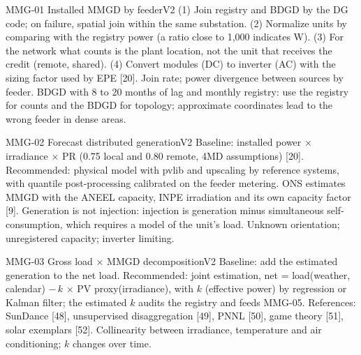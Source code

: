 \begin{ficha}{MMG-01 \textperiodcentered{} Installed MMGD by feeder}{V2}
 (1) Join registry and BDGD by the DG code; on failure,
spatial join within the same substation. (2) Normalize units by
comparing with the registry power (a ratio close to 1,000 indicates W). (3)
For the network what counts is the plant location, not the unit that receives the credit
(remote, shared). (4) Convert modules (DC) to inverter (AC) with the
sizing factor used by EPE [20].
 Join rate; power divergence between sources by
feeder.
 BDGD with 8 to 20 months of lag and monthly registry: use the
registry for counts and the BDGD for topology; approximate coordinates lead
to the wrong feeder in dense areas.
\end{ficha}

\begin{ficha}{MMG-02 \textperiodcentered{} Forecast distributed generation}{V2}
 Baseline: installed power × irradiance × PR (0.75
local and 0.80 remote, 4MD assumptions) [20]. Recommended: physical model with
pvlib and upscaling by reference systems, with quantile
post-processing calibrated on the feeder metering. ONS estimates MMGD with
the ANEEL capacity, INPE irradiation and its own capacity factor [9].
 Generation is not injection: injection is generation minus
simultaneous self-consumption, which requires a model of the unit's load.
 Unknown orientation; unregistered capacity;
inverter limiting.
\end{ficha}

\begin{ficha}{MMG-03 \textperiodcentered{} Gross load × MMGD decomposition}{V2}
 Baseline: add the estimated generation to the net load.
Recommended: joint estimation, net = load(weather, calendar) $-\,k$ ×
PV proxy(irradiance), with $k$ (effective power) by regression or Kalman
filter; the estimated $k$ audits the registry and feeds MMG-05. References:
SunDance [48], unsupervised disaggregation [49], PNNL [50], game
theory [51], solar exemplars [52].
 Collinearity between irradiance, temperature and
air conditioning; $k$ changes over time.
\end{ficha}


